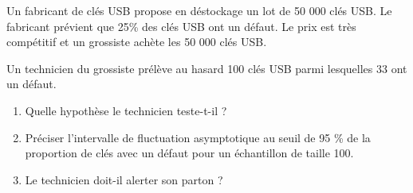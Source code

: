 
Un fabricant de clés USB propose  en déstockage un lot de 50 000 clés USB. Le fabricant prévient que 25\% des clés USB ont un défaut.
Le prix est très compétitif et un grossiste achète les 50 000 clés USB. 

Un technicien du grossiste prélève au hasard 100 clés USB parmi lesquelles 33 ont un défaut.
\begin{enumerate}
\item Quelle hypothèse le technicien teste-t-il ? 
\item Préciser l'intervalle de fluctuation asymptotique au seuil de 95 \% de la proportion de clés avec un défaut pour un échantillon de taille 100.
\item Le technicien doit-il alerter son parton ?
\end{enumerate}